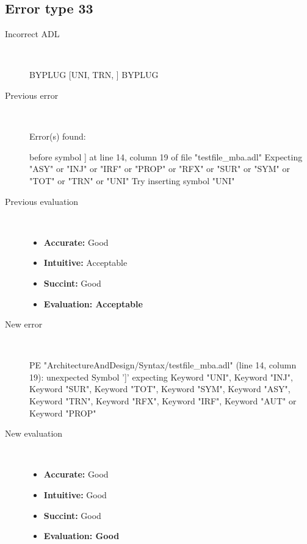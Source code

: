 \hrulefill

\subsection{Error type 33}
  \begin{description}
  \item[Incorrect ADL]~\\
\begin{adl}
BYPLUG [UNI, TRN, ] BYPLUG\end{adl}
  \item[Previous error]~\\
\begin{haskell}
Error(s) found:

before symbol ] at line 14, column 19 of file "testfile_mba.adl"
Expecting "ASY" or "INJ" or "IRF" or "PROP" or "RFX" or "SUR" or "SYM" or "TOT"
or "TRN" or "UNI"
Try inserting symbol "UNI"
\end{haskell}
  \item[Previous evaluation]~\\
    \begin{itemize}
    \item \textbf{Accurate:} Good
    \item \textbf{Intuitive:} Acceptable
    \item \textbf{Succint:} Good
    \item \textbf{Evaluation: Acceptable}
    \end{itemize}
  \item[New error]~\\
\begin{haskell}
PE "ArchitectureAndDesign/Syntax/testfile_mba.adl" (line 14, column 19):
unexpected Symbol ']'
expecting Keyword "UNI", Keyword "INJ", Keyword "SUR", Keyword "TOT", Keyword "SYM", Keyword "ASY", Keyword "TRN", Keyword "RFX", Keyword "IRF", Keyword "AUT" or Keyword "PROP"
\end{haskell}
  \item[New evaluation]~\\
    \begin{itemize}
    \item \textbf{Accurate:} Good
    \item \textbf{Intuitive:} Good
    \item \textbf{Succint:} Good
    \item \textbf{Evaluation: Good
}
    \end{itemize}
  \end{description}

